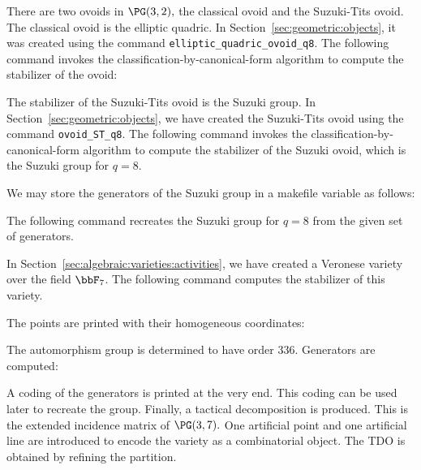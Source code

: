 

\bigskip

There are two ovoids in $\PG(3,2),$ 
the classical ovoid and the Suzuki-Tits ovoid. 
The classical ovoid is the elliptic quadric. 
In Section~\ref{sec:geometric:objects}, 
it was created using the command \verb'elliptic_quadric_ovoid_q8'. 
The following command invokes the 
classification-by-canonical-form algorithm to compute the stabilizer of the ovoid:


The stabilizer of the Suzuki-Tits ovoid is the Suzuki group.
In Section~\ref{sec:geometric:objects}, 
we have created the Suzuki-Tits ovoid 
using the command \verb'ovoid_ST_q8'. 
The following command invokes the 
classification-by-canonical-form algorithm to compute the stabilizer of the Suzuki ovoid, 
which is the Suzuki group for $q=8.$


We may store the generators of the Suzuki group in a makefile variable as follows:


The following command recreates the Suzuki group for $q=8$ from the given set of generators.




\bigskip


In Section~\ref{sec:algebraic:varieties:activities}, 
we have created a Veronese variety over the field $\bbF_7$. 
The following command computes the stabilizer of this variety. 


The points are printed with their homogeneous coordinates:


The automorphism group is determined to have order 336. 
Generators are computed:


A coding of the generators is printed at the very end. 
This coding can be used later to recreate the group.
Finally, a tactical decomposition is produced. 
This is the extended incidence matrix of $\PG(3,7).$ 
One artificial point and one artificial line 
are introduced to encode the variety as a 
combinatorial object. 
The TDO is obtained by refining the partition.



